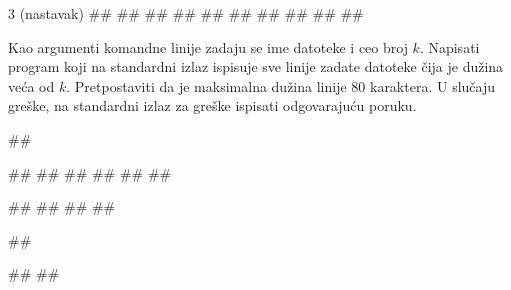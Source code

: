 \begin{Exercise}[label=v3_06]
\begin{miditest}
\begin{upotreba}{3 (nastavak)}
#\naslovIzlaz#
##
##
##
##
##
#\izlaz{}#
##
##
##
\end{upotreba}
\end{miditest}

\end{Exercise}
\begin{Answer}[ref=v3_06]
\end{Answer}





\begin{Exercise}[label=p3_03] 
 Kao argumenti komandne linije zadaju se ime datoteke i ceo broj $k$. 
 Napisati program koji na  standardni izlaz ispisuje sve linije zadate datoteke čija je dužina veća od $k$. 
 Pretpostaviti da je maksimalna dužina linije $80$ karaktera.
 U slučaju greške, na standardni izlaz za greške ispisati odgovarajuću poruku.

\begin{miditest}
\begin{upotreba}{1}
##

##
##
##
##
##
##

#\naslovIzlaz#
##
##
##
\end{upotreba}
\end{miditest}
\begin{miditest}
\begin{upotreba}{2}
##

#\naslovIzlazZaGresku#
##
\end{upotreba}
\end{miditest}
\end{Exercise}
\begin{Answer}[ref=p3_03]
\end{Answer}


